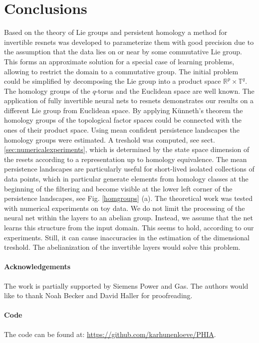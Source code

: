 \documentclass[envcountsect,runningheads]{llncs}
\begin{document}
\section{Conclusions}
\label{sec:conclusion}
Based on the theory of Lie groups and persistent homology a method for invertible resnets was developed to parameterize them with good precision due to the assumption that the data lies on or near by some commutative Lie group. This forms an approximate solution for a special case of learning problems, allowing to restrict the domain to a commutative group. The initial problem could be simplified by decomposing the Lie group into a product space $\mathbb{R}^p \times \mathbb{T}^q$. The homology groups of the $q$-torus and the Euclidean space are well known. The application of fully invertible neural nets to resnets demonstrates our results on a different Lie group from Euclidean space. By applying Künneth's theorem the homology groups of the topological factor spaces could be connected with the ones of their product space. Using mean confident persistence landscapes the homology groups were estimated. A treshold was computed, see sect. \ref{sec:numericalexperiments}, which is determined by the state space dimension of the resets according to a representation up to homology equivalence. The mean persistence landscapes are particularly useful for short-lived isolated collections of data points, which in particular generate elements from homology classes at the beginning of the filtering and become visible at the lower left corner of the persistence landscapes, see Fig. \ref{homgroups} (a). The theoretical work was tested with numerical experiments on toy data. We do not limit the processing of the neural net within the layers to an abelian group. Instead, we assume that the net learns this structure from the input domain. This seems to hold, according to our experiments. Still, it can cause inaccuracies in the estimation of the dimensional treshold. The abelianization of the invertible layers would solve this problem.

\paragraph{Acknowledgements} The work is partially supported by Siemens Power and Gas. The authors would like to thank Noah Becker and David Haller for proofreading.

\paragraph{Code} The code can be found at: \href{https://github.com/karhunenloeve/PHIA}{https://github.com/karhunenloeve/PHIA}.
%
%
%
%
%
%
%
\newpage
\appendix
\end{document}
